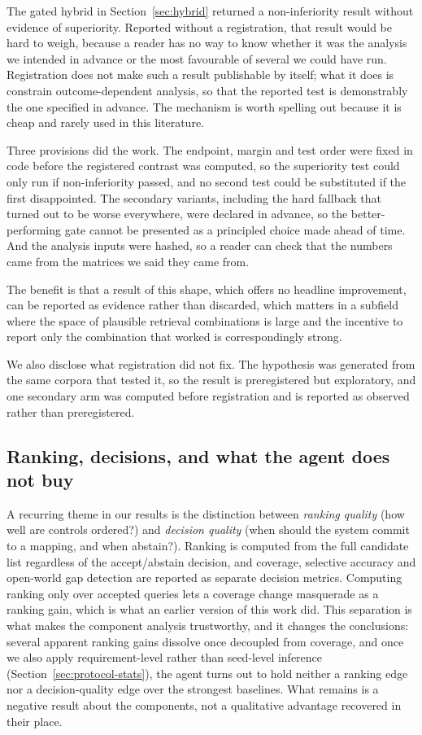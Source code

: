 \documentclass[smallextended,natbib]{svjour3}
\begin{document}
The gated hybrid in Section~\ref{sec:hybrid} returned a non-inferiority result without evidence of superiority. Reported without a registration, that result would be hard to weigh, because a reader has no way to know whether it was the analysis we intended in advance or the most favourable of several we could have run. Registration does not make such a result publishable by itself; what it does is constrain outcome-dependent analysis, so that the reported test is demonstrably the one specified in advance. The mechanism is worth spelling out because it is cheap and rarely used in this literature.

Three provisions did the work. The endpoint, margin and test order were fixed in code before the registered contrast was computed, so the superiority test could only run if non-inferiority passed, and no second test could be substituted if the first disappointed. The secondary variants, including the hard fallback that turned out to be worse everywhere, were declared in advance, so the better-performing gate cannot be presented as a principled choice made ahead of time. And the analysis inputs were hashed, so a reader can check that the numbers came from the matrices we said they came from.

The benefit is that a result of this shape, which offers no headline improvement, can be reported as evidence rather than discarded, which matters in a subfield where the space of plausible retrieval combinations is large and the incentive to report only the combination that worked is correspondingly strong.

We also disclose what registration did not fix. The hypothesis was generated from the same corpora that tested it, so the result is preregistered but exploratory, and one secondary arm was computed before registration and is reported as observed rather than preregistered.

\subsection{Ranking, decisions, and what the agent does not buy}

A recurring theme in our results is the distinction between \emph{ranking quality} (how well are controls ordered?) and \emph{decision quality} (when should the system commit to a mapping, and when abstain?).
Ranking is computed from the full candidate list regardless of the accept/abstain decision, and coverage, selective accuracy and open-world gap detection are reported as separate decision metrics. Computing ranking only over accepted queries lets a coverage change masquerade as a ranking gain, which is what an earlier version of this work did.
This separation is what makes the component analysis trustworthy, and it changes the conclusions: several apparent ranking gains dissolve once decoupled from coverage, and once we also apply requirement-level rather than seed-level inference (Section~\ref{sec:protocol-stats}), the agent turns out to hold neither a ranking edge nor a decision-quality edge over the strongest baselines. What remains is a negative result about the components, not a qualitative advantage recovered in their place.
\end{document}
